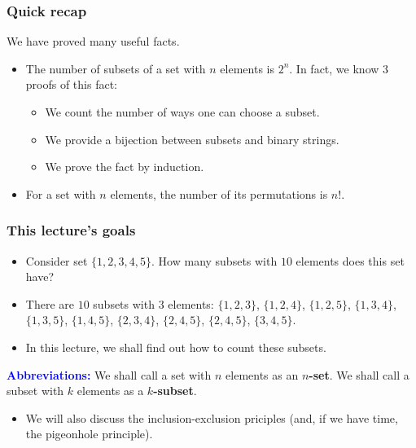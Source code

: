 

\begin{frame}\frametitle{Quick recap}
  We have proved many useful facts.
  \begin{itemize}
  \item The number of subsets of a set with $n$ elements is
    $2^n$. \pause In fact, we know 3 proofs of this fact:
    \begin{itemize}
    \item We count the number of ways one can choose a subset.
    \item We provide a bijection between subsets and binary strings.
    \item We prove the fact by induction.
    \end{itemize}
    \pause
  \item For a set with $n$ elements, the number of its permutations is
    $n!$.
  \end{itemize}
\end{frame}

\begin{frame}\frametitle{This lecture's goals}
  \begin{itemize}
  \item Consider set $\{1,2,3,4,5\}$.  How many subsets with $10$
    elements does this set have? \pause
  \item There are $10$ subsets with $3$ elements: $\{1,2,3\}$,
    $\{1,2,4\}$, $\{1,2,5\}$, $\{1,3,4\}$, $\{1,3,5\}$, $\{1,4,5\}$,
    $\{2,3,4\}$, $\{2,4,5\}$, $\{2,4,5\}$, $\{3,4,5\}$.
  \item In this lecture, we shall find out how to count these subsets. \pause
  \end{itemize}

  \begin{tcolorbox}
    {\bf\textcolor{blue}{Abbreviations:}} We shall call a set with $n$ elements as an
    {\bf $n$-set}.  We shall call a subset with $k$ elements as a {\bf
      $k$-subset}.
  \end{tcolorbox}

  \pause

  \begin{itemize}
  \item We will also discuss the inclusion-exclusion priciples (and,
    if we have time, the pigeonhole principle).
  \end{itemize}
\end{frame}

